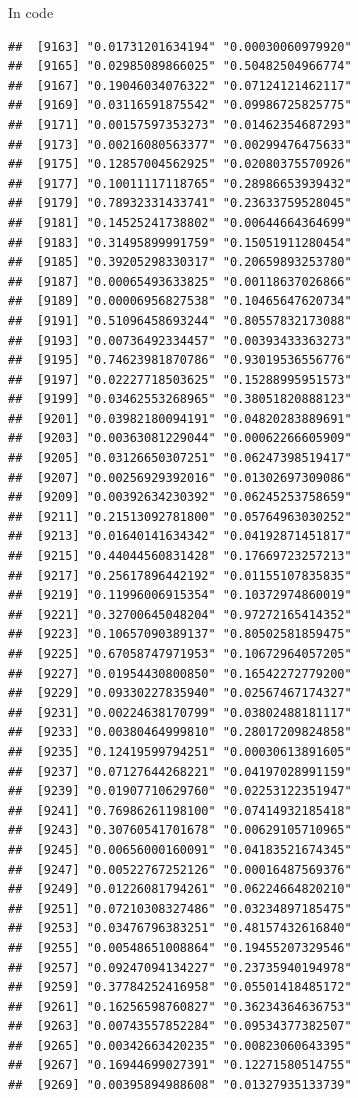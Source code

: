 \documentclass[ignorenonframetext,]{beamer}
\begin{document}
\begin{frame}[fragile]{In code}
\begin{verbatim}
##  [9163] "0.01731201634194" "0.00030060979920"
##  [9165] "0.02985089866025" "0.50482504966774"
##  [9167] "0.19046034076322" "0.07124121462117"
##  [9169] "0.03116591875542" "0.09986725825775"
##  [9171] "0.00157597353273" "0.01462354687293"
##  [9173] "0.00216080563377" "0.00299476475633"
##  [9175] "0.12857004562925" "0.02080375570926"
##  [9177] "0.10011117118765" "0.28986653939432"
##  [9179] "0.78932331433741" "0.23633759528045"
##  [9181] "0.14525241738802" "0.00644664364699"
##  [9183] "0.31495899991759" "0.15051911280454"
##  [9185] "0.39205298330317" "0.20659893253780"
##  [9187] "0.00065493633825" "0.00118637026866"
##  [9189] "0.00006956827538" "0.10465647620734"
##  [9191] "0.51096458693244" "0.80557832173088"
##  [9193] "0.00736492334457" "0.00393433363273"
##  [9195] "0.74623981870786" "0.93019536556776"
##  [9197] "0.02227718503625" "0.15288995951573"
##  [9199] "0.03462553268965" "0.38051820888123"
##  [9201] "0.03982180094191" "0.04820283889691"
##  [9203] "0.00363081229044" "0.00062266605909"
##  [9205] "0.03126650307251" "0.06247398519417"
##  [9207] "0.00256929392016" "0.01302697309086"
##  [9209] "0.00392634230392" "0.06245253758659"
##  [9211] "0.21513092781800" "0.05764963030252"
##  [9213] "0.01640141634342" "0.04192871451817"
##  [9215] "0.44044560831428" "0.17669723257213"
##  [9217] "0.25617896442192" "0.01155107835835"
##  [9219] "0.11996006915354" "0.10372974860019"
##  [9221] "0.32700645048204" "0.97272165414352"
##  [9223] "0.10657090389137" "0.80502581859475"
##  [9225] "0.67058747971953" "0.10672964057205"
##  [9227] "0.01954430800850" "0.16542272779200"
##  [9229] "0.09330227835940" "0.02567467174327"
##  [9231] "0.00224638170799" "0.03802488181117"
##  [9233] "0.00380464999810" "0.28017209824858"
##  [9235] "0.12419599794251" "0.00030613891605"
##  [9237] "0.07127644268221" "0.04197028991159"
##  [9239] "0.01907710629760" "0.02253122351947"
##  [9241] "0.76986261198100" "0.07414932185418"
##  [9243] "0.30760541701678" "0.00629105710965"
##  [9245] "0.00656000160091" "0.04183521674345"
##  [9247] "0.00522767252126" "0.00016487569376"
##  [9249] "0.01226081794261" "0.06224664820210"
##  [9251] "0.07210308327486" "0.03234897185475"
##  [9253] "0.03476796383251" "0.48157432616840"
##  [9255] "0.00548651008864" "0.19455207329546"
##  [9257] "0.09247094134227" "0.23735940194978"
##  [9259] "0.37784252416958" "0.05501418485172"
##  [9261] "0.16256598760827" "0.36234364636753"
##  [9263] "0.00743557852284" "0.09534377382507"
##  [9265] "0.00342663420235" "0.00823060643395"
##  [9267] "0.16944699027391" "0.12271580514755"
##  [9269] "0.00395894988608" "0.01327935133739"

\end{verbatim}
\end{frame}
\end{document}
